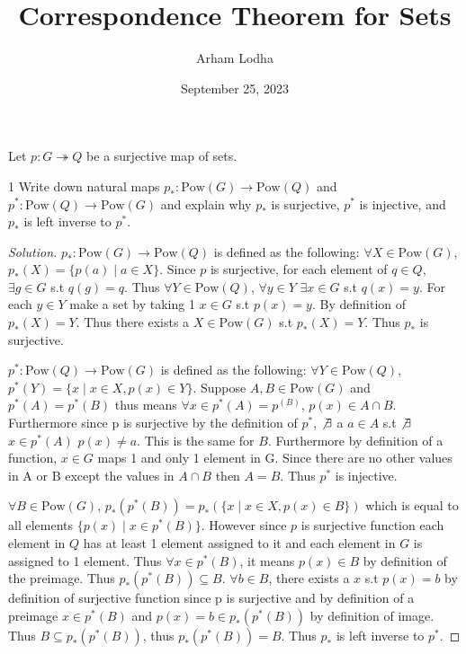 \documentclass{article}
\newcommand{\Pow}[0]{\text{Pow}}
\newenvironment{solution}
{\renewcommand\qedsymbol{$\blacksquare$}\begin{proof}[Solution]}
{\end{proof}}
\begin{document}
\title{Correspondence Theorem for Sets}
\author{Arham Lodha}%
\date{September 25, 2023}%
\maketitle

Let $p: G \twoheadrightarrow Q$ be a surjective map of sets. 

\begin{PROB}{1}\label{Problem 1.}
    Write down natural maps  $p_*: \Pow(G) \to \Pow(Q)$ and $p^*: \Pow(Q) \to \Pow(G)$ and explain why $p_*$ is surjective, $p^*$ is injective, and $p_*$ is left inverse to $p^*$.
\end{PROB}
\begin{solution}
    $p_*: \Pow(G) \to \Pow(Q)$ is defined as the following: $\forall X \in \Pow(G)$, $p_*(X) = \{p(a) \mid a \in X\}$. Since $p$ is surjective, for each element of $q \in Q$, $\exists g \in G$ s.t $q(g) = q$. Thus $\forall Y \in \Pow(Q)$, $\forall y \in Y$ $\exists x \in G$ s.t $q(x) = y$. For each $y \in Y$ make a set by taking 1 $x \in G$ s.t $p(x) = y$. By definition of $p_*(X) = Y$. Thus there exists a $X \in \Pow(G)$ s.t $p_*(X) = Y$. Thus $p_*$ is surjective.

    $p^*: \Pow(Q) \to \Pow(G)$ is defined as the following: $\forall Y \in \Pow(Q)$, $p^*(Y) = \{x \mid x\in X, p(x) \in Y\}$. Suppose $A, B \in \Pow(G)$ and $p^*(A) = p^*(B)$ thus means $\forall x \in p^*(A) = p^(B)$, $p(x) \in A \cap B$. Furthermore since p is surjective by the definition of $p^*$, $\not \exists$ a $a \in A$ s.t $\not \exists$ $x \in p^*(A)$ $p(x) \neq a$. This is the same for $B$. Furthermore by definition of a function, $x \in G$ maps 1 and only 1 element in G. Since there are no other values in A or B except the values in $A \cap B$ then $A = B$. Thus $p^*$ is injective.
    
    
    $\forall B \in \Pow(G)$, $p_*(p^*(B)) = p_*(\{x \mid x\in X, p(x) \in B\})$ which is equal to all elements $\{p(x) \mid x \in p^*(B)\}$. However since $p$ is surjective function each element in $Q$ has at least 1 element assigned to it and each element in $G$ is assigned to 1 element. Thus $\forall x\in p^*(B)$, it means $p(x) \in B$ by definition of the preimage. Thus $p_*(p^*(B)) \subseteq B$. $\forall b \in B$, there exists a $x$ s.t $p(x) = b$ by definition of surjective function since p is surjective and by definition of a preimage $x \in p^*(B)$ and $p(x) = b \in p_*(p^*(B))$ by definition of image. Thus $B \subseteq p_*(p^*(B))$, thus $p_*(p^*(B)) = B$. Thus $p_*$ is left inverse to $p^*$.
\end{solution}
\end{document}
